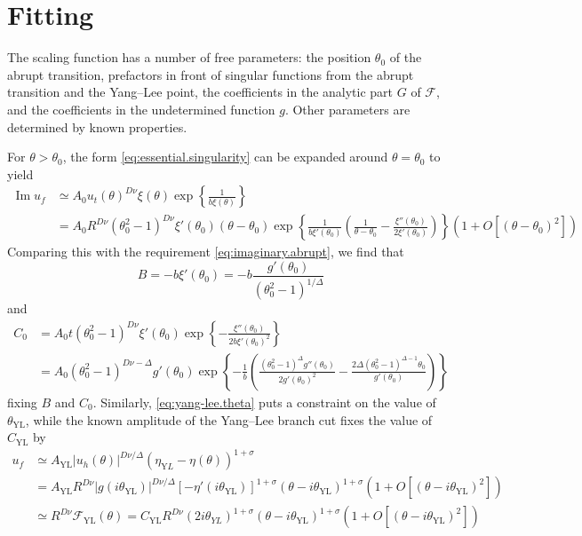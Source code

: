 \documentclass[
aps,
pre,
preprint,
longbibliography,
floatfix
]{revtex4-2}
\begin{document}
\section{Fitting}

The scaling function has a number of free parameters: the position $\theta_0$
of the abrupt transition, prefactors in front of singular functions from the
abrupt transition and the Yang--Lee point, the coefficients in the analytic
part $G$ of $\mathcal F$, and the coefficients in the undetermined function
$g$.  Other parameters are determined by known properties.

For $\theta>\theta_0$, the form \eqref{eq:essential.singularity} can be
expanded around $\theta=\theta_0$ to yield
\begin{equation}
  \begin{aligned}
    \operatorname{Im}u_f
    &\simeq A_0 u_t(\theta)^{D\nu}\xi(\theta)\exp\left\{\frac1{b\xi(\theta)}\right\} \\
    &=A_0R^{D\nu}(\theta_0^2-1)^{D\nu}\xi'(\theta_0)(\theta-\theta_0)
    \exp\left\{\frac1{b\xi'(\theta_0)}\left(\frac1{\theta-\theta_0}
      -\frac{\xi''(\theta_0)}{2\xi'(\theta_0)}\right)
      \right\}\left(1+O[(\theta-\theta_0)^2]\right)
  \end{aligned}
\end{equation}
Comparing this with the requirement \eqref{eq:imaginary.abrupt}, we find that
\begin{equation}
  B=-b\xi'(\theta_0)=-b\frac{g'(\theta_0)}{(\theta_0^2-1)^{1/\Delta}}
\end{equation}
and
\begin{equation}
  \begin{aligned}
    C_0&=A_0t(\theta_0^2-1)^{D\nu}\xi'(\theta_0)\exp\left\{
    -\frac{\xi''(\theta_0)}{2b\xi'(\theta_0)^2}
  \right\} \\
       &=
       A_0(\theta_0^2-1)^{D\nu-\Delta}g'(\theta_0)
       \exp\left\{-\frac1b\left(\frac{(\theta_0^2-1)^\Delta g''(\theta_0)}{2g'(\theta_0)^2}-\frac{2\Delta(\theta_0^2-1)^{\Delta - 1}\theta_0}{g'(\theta_0)}
       \right)\right\}
  \end{aligned}
\end{equation}
fixing $B$ and $C_0$. Similarly, \eqref{eq:yang-lee.theta} puts a constraint on the value of $\theta_\mathrm{YL}$, while the known amplitude of the Yang--Lee branch cut fixes the value of $C_\mathrm{YL}$ by
\begin{equation}
  \begin{aligned}
    u_f
    &\simeq A_\mathrm{YL}|u_h(\theta)|^{D\nu/\Delta}(\eta_{\mathrm YL}-\eta(\theta))^{1+\sigma} \\
    &=A_\mathrm{YL}R^{D\nu}|g(i\theta_\mathrm{YL})|^{D\nu/\Delta}[-\eta'(i\theta_\mathrm{YL})]^{1+\sigma}(\theta-i\theta_\mathrm{YL})^{1+\sigma}\left(1+O[(\theta-i\theta_\mathrm{YL})^2]\right)\\
    &\simeq R^{D\nu}\mathcal F_\mathrm{YL}(\theta)
    =C_\mathrm{YL}R^{D\nu}(2i\theta_{YL})^{1+\sigma}(\theta-i\theta_\mathrm{YL})^{1+\sigma}\left(1+O[(\theta-i\theta_\mathrm{YL})^2]\right)
\end{aligned}
\end{equation}
\end{document}
